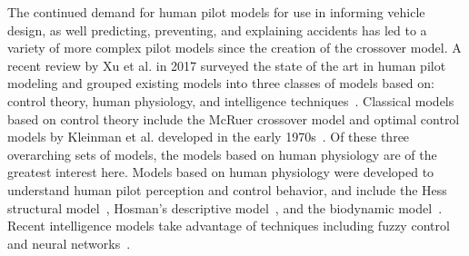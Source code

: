 The continued demand for human pilot models for use in informing vehicle design, as well predicting, preventing, and explaining accidents has led to a variety of more complex pilot models since the creation of the crossover model.
A recent review by Xu et al. in 2017 surveyed the state of the art in human pilot modeling and grouped existing models into three classes of models based on: control theory, human physiology, and intelligence techniques~\cite{xu_review_2017}.
Classical models based on control theory include the McRuer crossover model and optimal control models by Kleinman et al. developed in the early 1970s~\cite{kleinman_optimal_1970,baron_optimal_1970}.
Of these three overarching sets of models, the models based on human physiology are of the greatest interest here.
Models based on human physiology were developed to understand human pilot perception and control behavior, and include the Hess structural model~\cite{hess_structural_1980,hess_model_1990,hess_unified_1997}, Hosman's descriptive model~\cite{hosman_pilots_nodate,hosman_pilots_1999}, and the biodynamic model~\cite{griffin_validation_2001}.
Recent intelligence models take advantage of techniques including fuzzy control and neural networks~\cite{zaychik_conspectus_2006,gestwa_modelling_2003}.


